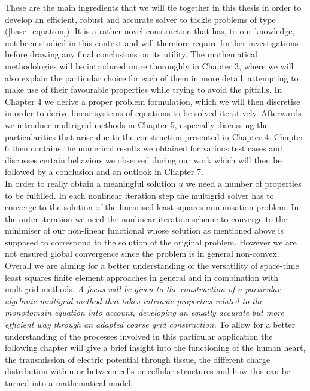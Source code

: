\documentclass[../draft_1.tex]{subfiles}
\begin{document}
These are the main ingredients that we will tie together in this thesis in order to develop an efficient, robust and accurate solver to tackle problems of type (\ref{base_equation}). It is a rather novel construction that has, to our knowledge, not been studied in this context and will therefore require further investigations before drawing any final conclusions on its utility. The mathematical methodologies will be introduced more thoroughly in Chapter 3, where we will also explain the particular choice for each of them in more detail, attempting to make use of their favourable properties while trying to avoid the pitfalls. In Chapter 4 we derive a proper problem formulation, which we will then discretise in order to derive linear systems of equations to be solved iteratively. Afterwards we introduce multrigrid methods in Chapter 5, especially discussing the particularities that arise due to the construction presented in Chapter 4. Chapter 6 then contains the numerical results we obtained for various test cases and discusses certain behaviors we observed during our work which will then be followed by a conclusion and an outlook in Chapter 7. 
\bigskip
\\ 
In order to really obtain a meaningful solution $u$ we need a number of properties to be fulfilled. In each nonlinear iteration step the multigrid solver has to converge to the solution of the linearised least squares minimisation problem. In the outer iteration we need the nonlinear iteration scheme to converge to the minimiser of our non-linear functional whose solution as mentioned above is supposed to correspond to the solution of the original problem. However we are not ensured global convergence since the problem is in general non-convex. 
\bigskip
\\
Overall we are aiming for a better understanding of the versatility of space-time least squares finite element approaches in general and in combination with multigrid methods. \textit{A focus will be given to the construction of a particular algebraic multigrid method that takes intrinsic properties related to the monodomain equation into account, developing an equally accurate but more efficient way through an adapted coarse grid construction.} To allow for a better understanding of the processes involved in this particular application the following chapter will give a brief insight into the functioning of the human heart, the transmission of electric potential through tissue, the different charge distribution within or between cells or cellular structures and how this can be turned into a mathematical model. 
\end{document}
